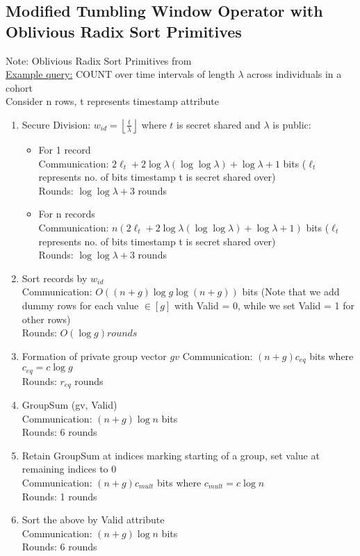 \subsection{Modified Tumbling Window Operator with Oblivious Radix Sort Primitives}
Note: Oblivious Radix Sort Primitives from \cite{Ha22} \\
\underline{Example query:} COUNT over time intervals of length $\lambda$ across individuals in a cohort \\
Consider n rows, t represents timestamp attribute 
\begin{enumerate}
\item Secure Division: $w_{id} = \left\lfloor \frac{t}{\lambda} \right\rfloor$ where $t$ is secret shared and $\lambda$ is public:
\begin{itemize}
\item For 1 record \\
Communication: $2\ell_{t} + 2\log \lambda (\log \log \lambda) + \log \lambda + 1$ bits ($\ell_{t}$ represents no. of bits timestamp t is secret shared over) \\
Rounds: $\log \log \lambda + 3$ rounds
\item For n records \\
Communication: $n(2\ell_{t} + 2\log \lambda (\log \log \lambda) + \log \lambda + 1)$ bits ($\ell_{t}$ represents no. of bits timestamp t is secret shared over) \\
Rounds: $\log \log \lambda + 3$ rounds
\end{itemize}
\item Sort records by $w_{id}$ \\
Communication: $O((n+g) \log g \log (n+g))$ bits (Note that we add dummy rows for each value $\in [g]$ with Valid = 0, while we set Valid = 1 for other rows) \\
Rounds: $O(\log g) rounds$
\item Formation of private group vector $gv$
Communication: $(n+g) c_{eq}$ bits where $c_{eq} = c \log g$ \\
Rounds: $r_{eq}$ rounds
\item GroupSum (gv, Valid)  \\
Communication: $(n+g) \log n$ bits \\
Rounds: 6 rounds
\item Retain GroupSum at indices marking starting of a group, set value at remaining indices to 0 \\
Communication: $(n+g) c_{mult}$ bits where $c_{mult} = c \log n$\\
Rounds: 1 rounds
\item Sort the above by Valid attribute \\
Communication: $(n+g) \log n$ bits \\
Rounds: 6 rounds
\end{enumerate}

